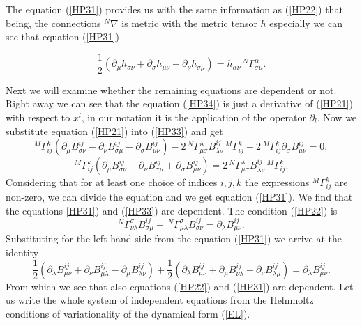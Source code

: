 \documentclass[english]{article}
\begin{document}
The equation (\ref{HP31}) provides us with the same information as (\ref{HP22}) that being, the connections $^N\nabla$ is metric with the metric tensor $h$ especially we can see that equation (\ref{HP31}) 

\begin{equation}
\label{vysl1}
\frac{1}{2}\left(\partial_\mu h_{\sigma\nu}+\partial_\sigma h_{\mu\nu}-\partial_\nu h_{\sigma\mu}\right)=h_{\alpha\nu}\,^N\Gamma^\alpha_{\sigma\mu}.
\end{equation}


Next we will examine whether the remaining equations are dependent or not. Right away we can see that the equation (\ref{HP34}) is just a derivative of (\ref{HP21}) with respect to $x^l$, in our notation it is the application of the operator $\partial_l$. Now we substitute equation (\ref{HP21}) into (\ref{HP33}) and get
$$
^M\Gamma^k_{ij}\left(\partial_\mu B^{ij}_{\sigma\nu}-\partial_\nu B^{ij}_{\sigma\mu}-\partial_\sigma B^{ij}_{\mu\nu}\right)-2\,^N\Gamma^\lambda_{\mu\sigma}B^{ij}_{\lambda\nu}\,^M\Gamma^k_{ij}+2\,^M\Gamma^k_{ij}\partial_\sigma B^{ij}_{\mu\nu}=0,
$$
$$
^M\Gamma^k_{ij}\left(\partial_\mu B^{ij}_{\sigma\nu}-\partial_\nu B^{ij}_{\sigma\mu}+\partial_\sigma B^{ij}_{\mu\nu}\right)=2\,^N\Gamma^\lambda_{\mu\sigma}B^{ij}_{\lambda\nu}\,^M\Gamma^k_{ij}.
$$
Considering that for at least one choice of indices $i,j,k$ the expressions $^M\Gamma^k_{ij}$ are non-zero, we can divide the equation and we get equation (\ref{HP31}). We find that the equations \ref{HP31}) and (\ref{HP33}) are dependent. The condition (\ref{HP22}) is
\begin{equation}
\label{dB}
^N\Gamma^\sigma_{\nu\lambda}B^{ij}_{\sigma\mu}+\,^N\Gamma^\sigma_{\mu\lambda}B^{ij}_{\sigma\nu}=\partial_\lambda B^{ij}_{\mu\nu}.
\end{equation}
Substituting for the left hand side from the equation (\ref{HP31}) we arrive at the identity
$$
\frac{1}{2}\left(\partial_\lambda B^{ij}_{\mu\nu}+\partial_\nu B^{ij}_{\mu\lambda}-\partial_\mu B^{ij}_{\lambda\nu}\right)
+
\frac{1}{2}\left(\partial_\lambda B^{ij}_{\mu\nu}+\partial_\mu B^{ij}_{\nu\lambda}-\partial_\nu B^{ij}_{\lambda\mu}\right)
=\partial_\lambda B^{ij}_{\mu\nu}.
$$
From which we see that also equations (\ref{HP22}) and (\ref{HP31}) are dependent. Let us write the whole system of independent equations from the Helmholtz conditions of variationality of the dynamical form (\ref{EL}).
\end{document}
